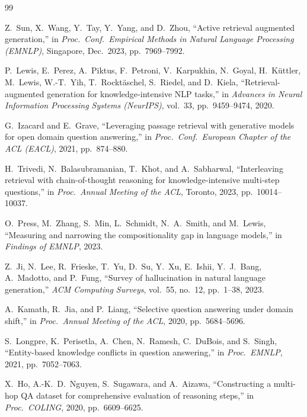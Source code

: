 \documentclass[conference]{IEEEtran}
\begin{document}
\begin{thebibliography}{99}

Z.~Sun, X.~Wang, Y.~Tay, Y.~Yang, and D.~Zhou,
``Active retrieval augmented generation,''
in \emph{Proc.\ Conf.\ Empirical Methods in Natural Language Processing
  (EMNLP)}, Singapore, Dec.\ 2023, pp.\ 7969--7992.

P.~Lewis, E.~Perez, A.~Piktus, F.~Petroni, V.~Karpukhin,
N.~Goyal, H.~K\"{u}ttler, M.~Lewis, W.-T.~Yih, T.~Rockt\"{a}schel,
S.~Riedel, and D.~Kiela,
``Retrieval-augmented generation for knowledge-intensive NLP tasks,''
in \emph{Advances in Neural Information Processing Systems (NeurIPS)},
vol.~33, pp.\ 9459--9474, 2020.

G.~Izacard and E.~Grave,
``Leveraging passage retrieval with generative models for open domain
  question answering,''
in \emph{Proc.\ Conf.\ European Chapter of the ACL (EACL)},
2021, pp.\ 874--880.

H.~Trivedi, N.~Balasubramanian, T.~Khot, and A.~Sabharwal,
``Interleaving retrieval with chain-of-thought reasoning for
  knowledge-intensive multi-step questions,''
in \emph{Proc.\ Annual Meeting of the ACL}, Toronto, 2023,
pp.\ 10014--10037.

O.~Press, M.~Zhang, S.~Min, L.~Schmidt, N.~A.~Smith, and M.~Lewis,
``Measuring and narrowing the compositionality gap in language models,''
in \emph{Findings of EMNLP}, 2023.

Z.~Ji, N.~Lee, R.~Frieske, T.~Yu, D.~Su, Y.~Xu,
E.~Ishii, Y.~J.~Bang, A.~Madotto, and P.~Fung,
``Survey of hallucination in natural language generation,''
\emph{ACM Computing Surveys}, vol.~55, no.~12, pp.\ 1--38, 2023.

A.~Kamath, R.~Jia, and P.~Liang,
``Selective question answering under domain shift,''
in \emph{Proc.\ Annual Meeting of the ACL}, 2020, pp.\ 5684--5696.

S.~Longpre, K.~Perisetla, A.~Chen, N.~Ramesh,
C.~DuBois, and S.~Singh,
``Entity-based knowledge conflicts in question answering,''
in \emph{Proc.\ EMNLP}, 2021, pp.\ 7052--7063.

X.~Ho, A.-K.~D.~Nguyen, S.~Sugawara, and A.~Aizawa,
``Constructing a multi-hop QA dataset for comprehensive evaluation of
  reasoning steps,''
in \emph{Proc.\ COLING}, 2020, pp.\ 6609--6625.


\end{thebibliography}
\end{document}
